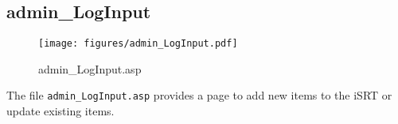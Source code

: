 \subsection{admin\_LogInput}
\begin{figure}[htb]
    \begin{center}
        \texttt{[image: figures/admin\_LogInput.pdf]}
    \end{center}
    \caption{admin\_LogInput.asp}
    \label{fig:admin_LogInput}
\end{figure}

The file \verb|admin_LogInput.asp| provides a page to add new items to the iSRT
or update existing items.
